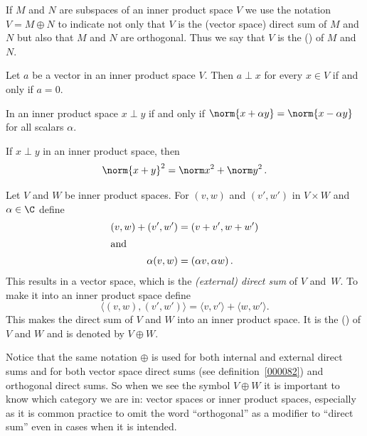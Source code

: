 \begin{defn} If $M$ and $N$ are subspaces of an inner product space $V$ we use the notation
$V = M \oplus N$ to indicate not only that $V$ is the (vector space) direct sum of $M$
and $N$ but also that $M$ and $N$ are orthogonal. Thus we say that $V$ is the
()  of $M$ and~$N$.
\end{defn}

\begin{prop} Let $a$ be a vector in an inner product space $V$.  Then $a \perp x$ for every
$x \in V$ if and only if $a = 0$.
\end{prop}

\begin{prop} In an inner product space $x \perp y$ if and only if $\norm{x + \alpha y} = \norm{x - \alpha y}$
for all scalars $\alpha$.
\end{prop}

\begin{prop}\label{00015037}  If $x \perp y$ in an inner
product space, then
   \[ \norm{x + y}^2 = \norm x^2 + \norm y^2\,. \]
\end{prop}

\begin{defn}\label{0001504} Let $V$ and $W$ be inner product spaces.  For $(v,w)$ and
$(v',w')$ in $V \times W$ and $\alpha \in \C$ define
 \begin{align*}
      (v,w) + (v',w') &= (v + v', w + w') \\
\intertext{and}
         \alpha(v,w) &= (\alpha v,\alpha w)\,.
 \end{align*}
This results in a vector space, which is the \emph{(external) direct sum} of $V$ and~$W$.
To make it into an inner product space define
   \[ \langle (v,w),(v',w') \rangle = \langle v,v' \rangle + \langle w,w' \rangle. \]
This makes the direct sum of $V$ and $W$ into an inner product space.  It is the
()
 of $V$ and $W$ and is denoted by $V \oplus W$.
\end{defn}

Notice that the same notation $\oplus$ is used for both internal and external direct sums
and for both vector space direct sums (see definition~\ref{000082}) and orthogonal direct
sums. So when we see the symbol $V \oplus W$ it is important to know which category we
are in: vector spaces or inner product spaces, especially as it is common practice to
omit the word ``orthogonal'' as a modifier to ``direct sum'' even in cases when it is
intended.

